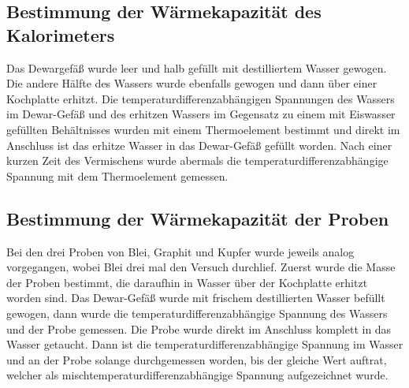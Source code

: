 \subsection{Bestimmung der Wärmekapazität des Kalorimeters}
Das Dewargefäß wurde leer und halb gefüllt mit destilliertem Wasser gewogen. Die andere Hälfte des Wassers wurde 
ebenfalls gewogen und dann über einer Kochplatte erhitzt. Die temperaturdifferenzabhängigen Spannungen des 
Wassers im Dewar-Gefäß und des erhitzen Wassers im Gegensatz zu einem mit Eiswasser gefüllten 
Behältnisses wurden mit einem Thermoelement bestimmt und direkt im Anschluss ist das erhitze Wasser
in das Dewar-Gefäß gefüllt worden. Nach einer kurzen Zeit des Vermischens wurde abermals die 
temperaturdifferenzabhängige Spannung mit dem Thermoelement gemessen.
\subsection{Bestimmung der Wärmekapazität der Proben}  
Bei den drei Proben von Blei, Graphit und Kupfer wurde jeweils analog vorgegangen, wobei Blei drei
mal den Versuch durchlief. Zuerst wurde die Masse der Proben bestimmt, die daraufhin in Wasser über 
der Kochplatte erhitzt worden sind.
Das Dewar-Gefäß wurde mit frischem destillierten Wasser befüllt gewogen, dann wurde die 
temperaturdifferenzabhängige Spannung des Wassers und der Probe gemessen. Die Probe wurde direkt 
im Anschluss komplett in das Wasser getaucht. Dann ist die temperaturdifferenzabhängige Spannung 
im Wasser und an der Probe solange durchgemessen worden, bis der gleiche Wert auftrat, 
welcher als mischtemperaturdifferenzabhängige Spannung aufgezeichnet wurde.